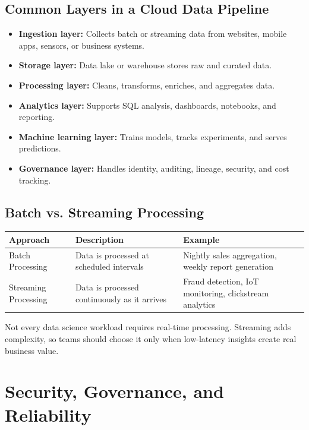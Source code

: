 \documentclass[11pt,a4paper]{article}
\begin{document}
\subsection{Common Layers in a Cloud Data Pipeline}

\begin{itemize}[leftmargin=*]
  \item \textbf{Ingestion layer:} Collects batch or streaming data from websites, mobile apps, sensors, or business systems.
  \item \textbf{Storage layer:} Data lake or warehouse stores raw and curated data.
  \item \textbf{Processing layer:} Cleans, transforms, enriches, and aggregates data.
  \item \textbf{Analytics layer:} Supports SQL analysis, dashboards, notebooks, and reporting.
  \item \textbf{Machine learning layer:} Trains models, tracks experiments, and serves predictions.
  \item \textbf{Governance layer:} Handles identity, auditing, lineage, security, and cost tracking.
\end{itemize}

\subsection{Batch vs. Streaming Processing}

\begin{longtable}{p{3.1cm}p{5.2cm}p{5.0cm}}
\toprule
\textbf{Approach} & \textbf{Description} & \textbf{Example} \\
\midrule
Batch Processing & Data is processed at scheduled intervals & Nightly sales aggregation, weekly report generation \\
Streaming Processing & Data is processed continuously as it arrives & Fraud detection, IoT monitoring, clickstream analytics \\
\bottomrule
\end{longtable}

\begin{alertbox}
Not every data science workload requires real-time processing. Streaming adds complexity, so teams should choose it only when low-latency insights create real business value.
\end{alertbox}

\section{Security, Governance, and Reliability}
\end{document}
